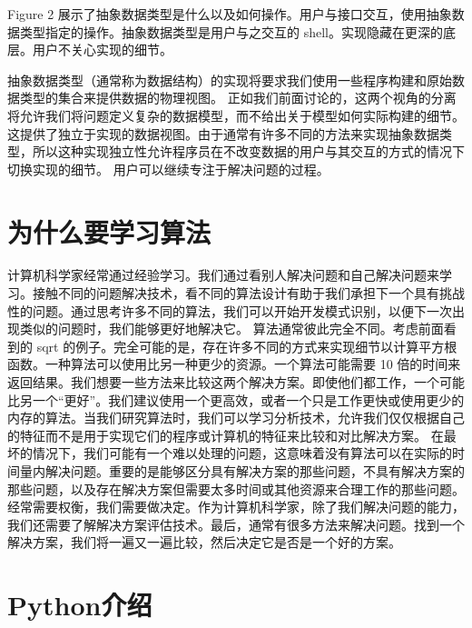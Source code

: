 \documentclass[10pt,a4paper]{article}
\begin{document}
Figure 2 展示了抽象数据类型是什么以及如何操作。用户与接口交互，使用抽象数据类型指定的操作。抽象数据类型是用户与之交互的 shell。实现隐藏在更深的底层。用户不关心实现的细节。 



抽象数据类型（通常称为数据结构）的实现将要求我们使用一些程序构建和原始数据类型的集合来提供数据的物理视图。 正如我们前面讨论的，这两个视角的分离将允许我们将问题定义复杂的数据模型，而不给出关于模型如何实际构建的细节。 这提供了独立于实现的数据视图。由于通常有许多不同的方法来实现抽象数据类型，所以这种实现独立性允许程序员在不改变数据的用户与其交互的方式的情况下切换实现的细节。 用户可以继续专注于解决问题的过程。


\section{为什么要学习算法}

计算机科学家经常通过经验学习。我们通过看别人解决问题和自己解决问题来学习。接触不同的问题解决技术，看不同的算法设计有助于我们承担下一个具有挑战性的问题。通过思考许多不同的算法，我们可以开始开发模式识别，以便下一次出现类似的问题时，我们能够更好地解决它。
算法通常彼此完全不同。考虑前面看到的 sqrt 的例子。完全可能的是，存在许多不同的方式来实现细节以计算平方根函数。一种算法可以使用比另一种更少的资源。一个算法可能需要 10 倍的时间来返回结果。我们想要一些方法来比较这两个解决方案。即使他们都工作，一个可能比另一个“更好”。我们建议使用一个更高效，或者一个只是工作更快或使用更少的内存的算法。当我们研究算法时，我们可以学习分析技术，允许我们仅仅根据自己的特征而不是用于实现它们的程序或计算机的特征来比较和对比解决方案。
在最坏的情况下，我们可能有一个难以处理的问题，这意味着没有算法可以在实际的时间量内解决问题。重要的是能够区分具有解决方案的那些问题，不具有解决方案的那些问题，以及存在解决方案但需要太多时间或其他资源来合理工作的那些问题。
经常需要权衡，我们需要做决定。作为计算机科学家，除了我们解决问题的能力，我们还需要了解解决方案评估技术。最后，通常有很多方法来解决问题。找到一个解决方案，我们将一遍又一遍比较，然后决定它是否是一个好的方案。


\section{Python介绍}

\end{document}
